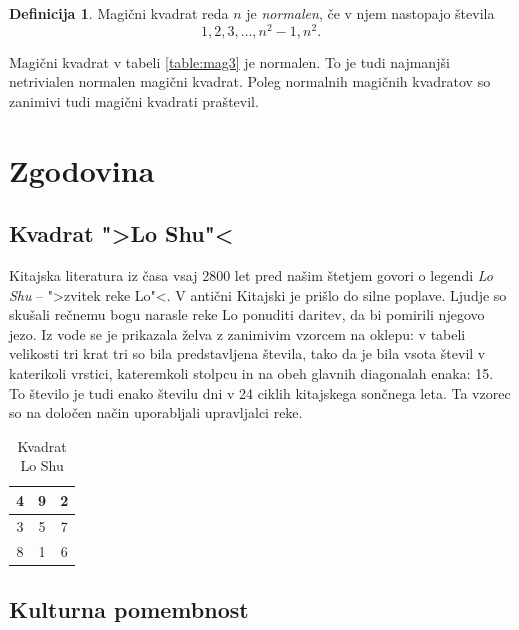 \documentclass[a4paper,12pt]{article}
\newcommand{\pojem}[1]{\emph{\color{purple}#1}}
\newenvironment{magic}[3]
{
   \begin{table}[!ht]
   \centering
   \caption{#2}
   \label{#3}
   \large
   \begin{tabular}{|*{#1}{c|}}
   \hline
}
{
   \end{tabular}
   \normalsize
\end{table}
}
\theoremstyle{definition}
\newtheorem{definicija}{Definicija}
\theoremstyle{plain}
\begin{document}
\begin{definicija}
   Magični kvadrat reda \(n\) je \pojem{normalen}, če v njem nastopajo števila
   \begin{equation}
      \label{eq:numbers}
      1, 2, 3, \ldots, n^2-1, n^2.
   \end{equation}
\end{definicija}

Magični kvadrat v tabeli \ref{table:mag3} je normalen.
To je tudi najmanjši netrivialen normalen magični kvadrat.
Poleg normalnih magičnih kvadratov so zanimivi tudi magični kvadrati praštevil.


\section{Zgodovina}

\subsection{Kvadrat ">Lo Shu"<}

Kitajska literatura iz časa vsaj 2800 let pred našim štetjem govori o legendi
\emph{Lo Shu} -- ">zvitek reke Lo"<. V antični Kitajski je prišlo do
silne poplave. Ljudje so skušali rečnemu bogu narasle reke Lo ponuditi daritev,
da bi pomirili njegovo jezo. Iz vode se je prikazala želva z zanimivim vzorcem
na oklepu: v tabeli velikosti tri krat tri so bila predstavljena števila, tako
da je bila vsota števil v katerikoli vrstici, kateremkoli stolpcu in na obeh
glavnih diagonalah enaka: 15. To število je tudi enako številu dni v 24 ciklih
kitajskega sončnega leta. Ta vzorec so na določen način uporabljali upravljalci
reke.
\begin{magic}{3}{Kvadrat Lo Shu}{table:loshu}
4 & 9 & 2 \\\hline
3 & 5 & 7 \\\hline
8 & 1 & 6 \\\hline
\end{magic}




\subsection{Kulturna pomembnost}
\end{document}
